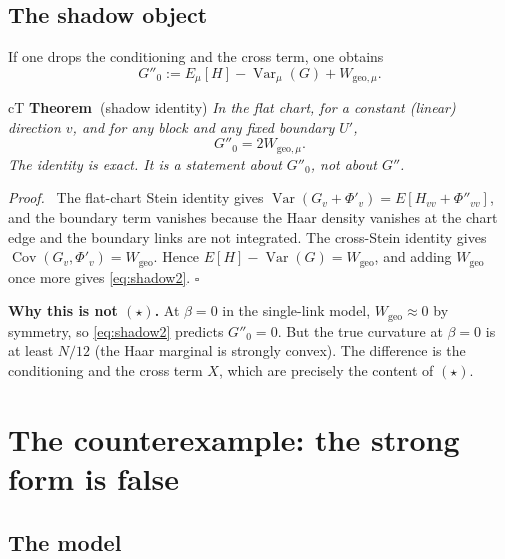 \documentclass[11pt,a4paper]{article}
\newcounter{claim}
\newcommand{\claimhead}[2]{%
  \refstepcounter{claim}%
  \textbf{#1~\theclaim}#2\hspace{0.35em}\ignorespaces}
\newenvironment{proofx}{\par\noindent\emph{Proof.}\ }{\hfill$\square$\par\medskip}
\begin{document}
\subsection{The shadow object}

If one drops the conditioning and the cross term, one obtains
\begin{equation}
G''_0:=E_\mu[H]-\operatorname{Var}_\mu(G)+W_{\mathrm{geo},\mu}.
\label{eq:shadow}
\end{equation}

\begin{claimbox}{cT}
\claimhead{Theorem}{(shadow identity)} \emph{In the flat chart, for a constant (linear) direction
$v$, and for any block and any fixed boundary $U'$,}
\begin{equation}
G''_0=2W_{\mathrm{geo},\mu}.
\label{eq:shadow2}
\end{equation}
\emph{The identity is exact. It is a statement about $G''_0$, not about $G''$.}
\end{claimbox}

\begin{proofx}
The flat-chart Stein identity gives
$\operatorname{Var}(G_v+\Phi'_v)=E[H_{vv}+\Phi''_{vv}]$, and the boundary term vanishes because the
Haar density vanishes at the chart edge and the boundary links are not integrated. The cross-Stein
identity gives $\operatorname{Cov}(G_v,\Phi'_v)=W_{\mathrm{geo}}$. Hence
$E[H]-\operatorname{Var}(G)=W_{\mathrm{geo}}$, and adding $W_{\mathrm{geo}}$ once more gives
\eqref{eq:shadow2}.
\end{proofx}

\textbf{Why this is not $(\star)$.} At $\beta=0$ in the single-link model, $W_{\mathrm{geo}}\approx0$
by symmetry, so \eqref{eq:shadow2} predicts $G''_0=0$. But the true curvature at $\beta=0$ is at
least $N/12$ (the Haar marginal is strongly convex). The difference is the conditioning and the
cross term $X$, which are precisely the content of $(\star)$.

\section{The counterexample: the strong form is false}
\label{sec:counter}

\subsection{The model}
\end{document}
